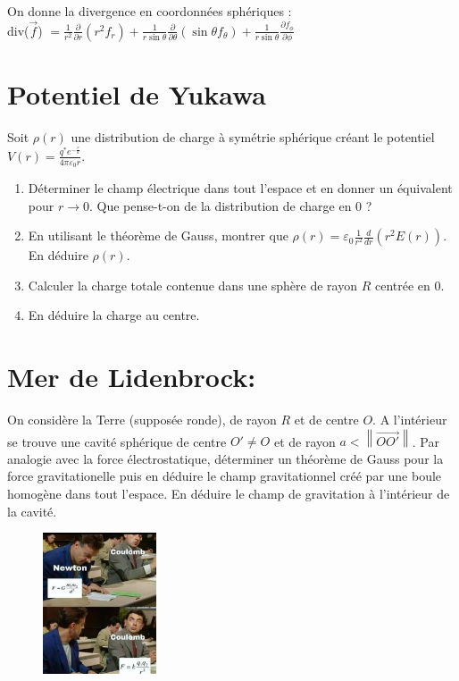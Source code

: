 \documentclass{article}
\begin{document}
On donne la divergence en coordonnées sphériques :\\[0.1cm] 

div($\vec{f}$) $=\frac{1}{r^2} \frac{\partial}{\partial r}(r^2 f_r) + \frac{1}{r \sin \theta} \frac{\partial}{\partial \theta}(\sin \theta f_\theta) + \frac{1}{r \sin \theta} \frac{\partial f_\phi}{\partial \phi}$

\section{Potentiel de Yukawa} 
Soit $\rho(r)$ une distribution de charge à symétrie sphérique créant le potentiel $V(r) = \frac{q^*e^{-\frac{r}{a}}}{4 \pi \varepsilon_0 r }$.
\begin{enumerate}
    \item Déterminer le champ électrique dans tout l'espace et en donner un équivalent pour $r \rightarrow 0$. Que pense-t-on de la distribution de charge en 0 ? 
    \item En utilisant le théorème de Gauss, montrer que $\rho(r) = \varepsilon_0 \frac{1}{r^2} \frac{d}{dr}(r^2 E(r))$. En déduire $\rho(r)$. 
    \item Calculer la charge totale contenue dans une sphère de rayon $R$ centrée en 0.
    \item En déduire la charge au centre.
\end{enumerate}


\section{Mer de Lidenbrock:}

On considère la Terre (supposée ronde), de rayon $R$ et de centre $O$. A l'intérieur se trouve une cavité sphérique de centre $O' \neq O $ et de rayon $a < \left\lVert \vec{OO'}\right\rVert $. 
Par analogie avec la force électrostatique, déterminer un théorème de Gauss pour la force gravitationelle puis en déduire le champ gravitationnel créé par une boule homogène dans tout l'espace. 
En déduire le champ de gravitation à l'intérieur de la cavité. \\





\begin{figure}[h]
  \centering
  \includegraphics[width=0.3\textwidth]{meme.jpg}
  \label{fig:maison}
\end{figure}
\end{document}
